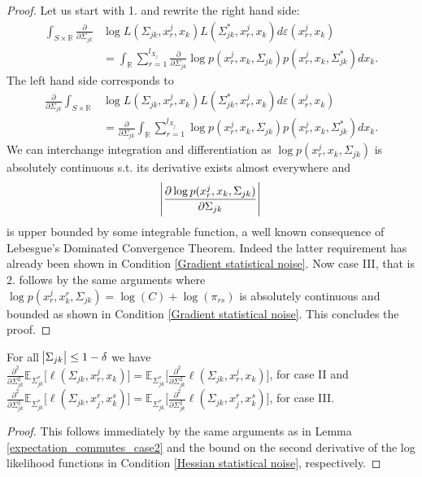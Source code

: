 \begin{lemma}
    \begin{proof}
        Let us start with 1. and rewrite the right hand side:
        \begin{align*}
            \int_{S\times \mathbb{R}} \frac{\partial }{\partial \Sigma_{jk}} &\log L(\Sigma_{jk}, x_r^j,x_k) L(\Sigma_{jk}^*, x_r^j,x_k) d\varepsilon(x_r^j,x_k) \\
            &= \int_\mathbb{R} \sum_{r=1}^{l_{X_j}} \frac{\partial }{\partial \Sigma_{jk}} \log p(x^j_{r},x_{k}, \Sigma_{jk}) p(x^j_{r},x_{k}, \Sigma^*_{jk}) dx_k.
        \end{align*}
        The left hand side corresponds to
        \begin{align*}
            \frac{\partial }{\partial \Sigma_{jk}} \int_{S\times \mathbb{R}} &\log L(\Sigma_{jk}, x_r^j,x_k) L(\Sigma_{jk}^*, x_r^j,x_k) d\varepsilon(x_r^j,x_k) \\
            &= \frac{\partial }{\partial \Sigma_{jk}} \int_\mathbb{R} \sum_{r=1}^{l_{X_j}} \log p(x^j_{r}, x_{k}, \Sigma_{jk}) p(x^j_{r},x_{k}, \Sigma_{jk}^*) dx_k.
        \end{align*}
        We can interchange integration and differentiation as $\log p(x^j_{r}, x_{k}, \Sigma_{jk})$ is absolutely continuous s.t. its derivative exists almost everywhere and 
        \begin{equation*}
            \abs{\frac{\partial \log p(x^j_{r}, x_{k}, \Sigma_{jk})}{\partial \Sigma_{jk}}}
        \end{equation*} is upper bounded by some integrable function, a well known consequence of Lebesgue's Dominated Convergence Theorem. Indeed the latter requirement has already been shown in Condition \ref{Gradient statistical noise}. Now case III, that is 2. follows by the same arguments where $\log p(x^j_{r}, x^r_{k}, \Sigma_{jk}) = \log(C) + \log(\pi_{rs})$ is absolutely continuous and bounded as shown in Condition \ref{Gradient statistical noise}. This concludes the proof.   
    \end{proof}
\end{lemma}


\begin{corollary}\label{expectation_commutes_case3}
    For all $\abs{\Sigma_{jk}} \leq 1-\delta$ we have \\
        $\frac{\partial^2 }{\partial \Sigma_{jk}^2} \mathbb{E}_{\Sigma_{jk}^*} \big[\ell(\Sigma_{jk}, x_r^j,x_k)\big] = \mathbb{E}_{\Sigma_{jk}^*} \Bigg[\frac{\partial^2 }{\partial \Sigma_{jk}^2} \ell(\Sigma_{jk}, x_r^j,x_k) \Bigg]$, for case II and \\
        $\frac{\partial^2 }{\partial \Sigma_{jk}^2} \mathbb{E}_{\Sigma_{jk}^*} \big[\ell(\Sigma_{jk}, x_j^r,x_k^s)\big] = \mathbb{E}_{\Sigma_{jk}^*} \Bigg[\frac{\partial^2 }{\partial \Sigma_{jk}^2} \ell(\Sigma_{jk}, x_j^r,x_k^s) \Bigg]$, for case III.
    
    \begin{proof}
        This follows immediately by the same arguments as in Lemma \ref{expectation_commutes_case2} and the bound on the second derivative of the log likelihood functions in Condition \ref{Hessian statistical noise}, respectively. 
    \end{proof}
\end{corollary}

